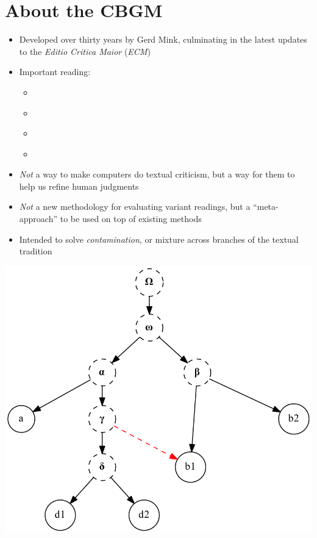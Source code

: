 \documentclass[10pt]{beamer}
\begin{document}
	\section*{About the CBGM}
	\begin{frame}
		\begin{itemize}
			\item Developed over thirty years by Gerd Mink, culminating in the latest updates to the \emph{Editio Critica Maior} (\emph{ECM})
			\item Important reading:
			\begin{itemize} 
				\item \cite{Mink04}
				\item \cite{Gurry17}
				\item \cite{WG17}
				\item \cite{Edmondson19}
			\end{itemize}
		\end{itemize}
	\end{frame}
	\begin{frame}
		\begin{itemize}
			\item \emph{Not} a way to make computers do textual criticism, but a way for them to help us refine human judgments
			\item \emph{Not} a new methodology for evaluating variant readings, but a ``meta-approach'' to be used on top of existing methods
		\end{itemize}
	\end{frame}
	\begin{frame}
		\begin{itemize}
			\item Intended to solve \emph{contamination}, or mixture across branches of the textual tradition
		\end{itemize}
		\begin{center}
			\includegraphics[scale=0.5]{../img/stemma-contamination.pdf}
		\end{center}
	\end{frame}
\end{document}
